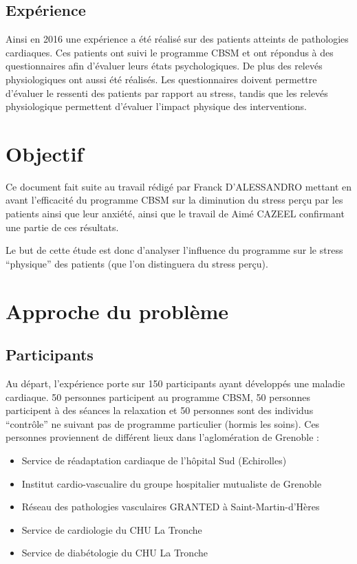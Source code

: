 \documentclass[]{article}
\providecommand{\tightlist}{%
  \setlength{\itemsep}{0pt}\setlength{\parskip}{0pt}}
\begin{document}
\hypertarget{experience}{%
\subsection{Expérience}\label{experience}}

Ainsi en 2016 une expérience a été réalisé sur des patients atteints de
pathologies cardiaques. Ces patients ont suivi le programme CBSM et ont
répondus à des questionnaires afin d'évaluer leurs états psychologiques.
De plus des relevés physiologiques ont aussi été réalisés. Les
questionnaires doivent permettre d'évaluer le ressenti des patients par
rapport au stress, tandis que les relevés physiologique permettent
d'évaluer l'impact physique des interventions.

\hypertarget{objectif}{%
\section{Objectif}\label{objectif}}

Ce document fait suite au travail rédigé par Franck D'ALESSANDRO mettant
en avant l'efficacité du programme CBSM sur la diminution du stress
perçu par les patients ainsi que leur anxiété, ainsi que le travail de
Aimé CAZEEL confirmant une partie de ces résultats.

Le but de cette étude est donc d'analyser l'influence du programme sur
le stress ``physique'' des patients (que l'on distinguera du stress
perçu).

\newpage

\hypertarget{approche-du-probleme}{%
\section{Approche du problème}\label{approche-du-probleme}}

\hypertarget{participants}{%
\subsection{Participants}\label{participants}}

Au départ, l'expérience porte sur 150 participants ayant développés une
maladie cardiaque. 50 personnes participent au programme CBSM, 50
personnes participent à des séances la relaxation et 50 personnes sont
des individus ``contrôle'' ne suivant pas de programme particulier
(hormis les soins). Ces personnes proviennent de différent lieux dans
l'aglomération de Grenoble :

\begin{itemize}
\tightlist
\item
  Service de réadaptation cardiaque de l'hôpital Sud (Echirolles)
\item
  Institut cardio-vascualire du groupe hospitalier mutualiste de
  Grenoble
\item
  Réseau des pathologies vasculaires GRANTED à Saint-Martin-d'Hères
\item
  Service de cardiologie du CHU La Tronche
\item
  Service de diabétologie du CHU La Tronche
\end{itemize}
\end{document}
